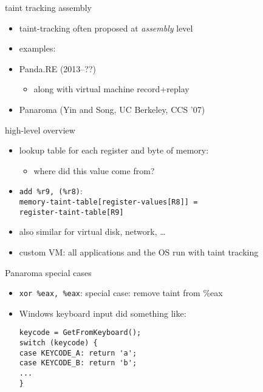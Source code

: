 \begin{frame}{taint tracking assembly}
\begin{itemize}
\item taint-tracking often proposed at \textit{assembly} level
\item examples:
\vspace{.5cm}
\item Panda.RE (2013--??)
    \begin{itemize}
    \item along with virtual machine record+replay
    \end{itemize}
\item Panaroma (Yin and Song, UC Berkeley, CCS '07)
\end{itemize}
\end{frame}

\begin{frame}{high-level overview}
\begin{itemize}
\item lookup table for each register and byte of memory:
    \begin{itemize}
    \item where did this value come from?
    \end{itemize}
\item \texttt{add \%r9, (\%r8)}: \\
    \texttt{memory-taint-table[register-values[R8]] =} \\
    \hspace{4cm} \texttt{register-taint-table[R9]}
\item also similar for virtual disk, network, \ldots
\item custom VM: all applications and the OS run with taint tracking
\end{itemize}
\end{frame}

\begin{frame}[fragile,label=panaromaSpecial]{Panaroma special cases}
\begin{itemize}
\item \texttt{xor \%eax, \%eax}: special case: remove taint from \%eax
\item Windows keyboard input did something like:
\begin{lstlisting}
keycode = GetFromKeyboard();
switch (keycode) {
case KEYCODE_A: return 'a';
case KEYCODE_B: return 'b';
...
}
\end{lstlisting}
\end{itemize}
\end{frame}

